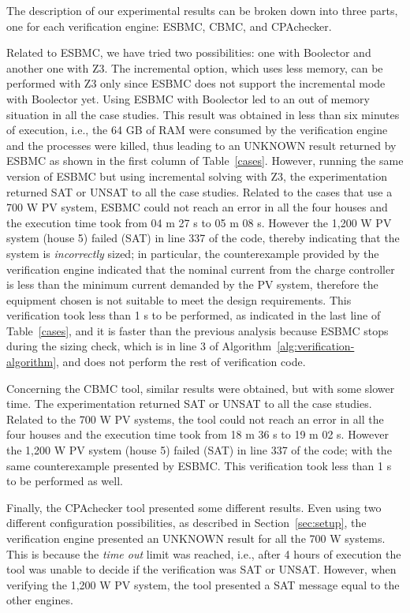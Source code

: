 \documentclass[review]{elsarticle}
\begin{document}
The description of our experimental results can be broken down into three parts, one for each verification engine: ESBMC, CBMC, and CPAchecker. 

Related to ESBMC, we have tried two possibilities: one with Boolector and another one with Z3. The incremental option, which uses less memory, can be performed with Z3 only since ESBMC does not support the incremental mode with Boolector yet. Using ESBMC with Boolector led to an out of memory situation in all the case studies. This result was obtained in less than six minutes of execution, i.e., the 64 GB of RAM were consumed by the verification engine and the processes were killed, thus leading to an UNKNOWN result returned by ESBMC as shown in the first column of Table~\ref{cases}. However, running the same version of ESBMC but using incremental solving with Z3, the experimentation returned SAT or UNSAT to all the case studies. Related to the cases that use a 700 W PV system, ESBMC could not reach an error in all the four houses and the execution time took from 04 m 27 s to 05 m 08 s. However the 1,200 W PV system (house 5) failed (SAT) in line 337 of the code, thereby indicating that the system is \textit{incorrectly} sized; in particular, the counterexample provided by the verification engine indicated that the nominal current from the charge controller is less than the minimum current demanded by the PV system, therefore the equipment chosen is not suitable to meet the design requirements.
This verification took less than 1 s to be performed, as indicated in the last line of Table~\ref{cases}, and it is faster than the previous analysis because ESBMC stops during the sizing check, which is in line 3 of Algorithm~\ref{alg:verification-algorithm}, and does not perform the rest of verification code. 

Concerning the CBMC tool, similar results were obtained, but with some slower time. The experimentation returned SAT or UNSAT to all the case studies. Related to the 700 W PV systems, the tool could not reach an error in all the four houses and the execution time took from 18 m 36 s to 19 m 02 s. However the 1,200 W PV system (house 5) failed (SAT) in line 337 of the code; with the same counterexample presented by ESBMC. This verification took less than 1 s to be performed as well. 

Finally, the CPAchecker tool presented some different results. Even using two different configuration possibilities, as described in Section~\ref{sec:setup}, the verification engine presented an UNKNOWN result for all the 700 W systems. This is because the \textit{time out} limit was reached, i.e., after 4 hours of execution the tool was unable to decide if the verification was SAT or UNSAT. However, when verifying the 1,200 W PV system, the tool presented a SAT message equal to the other engines. 
\end{document}

